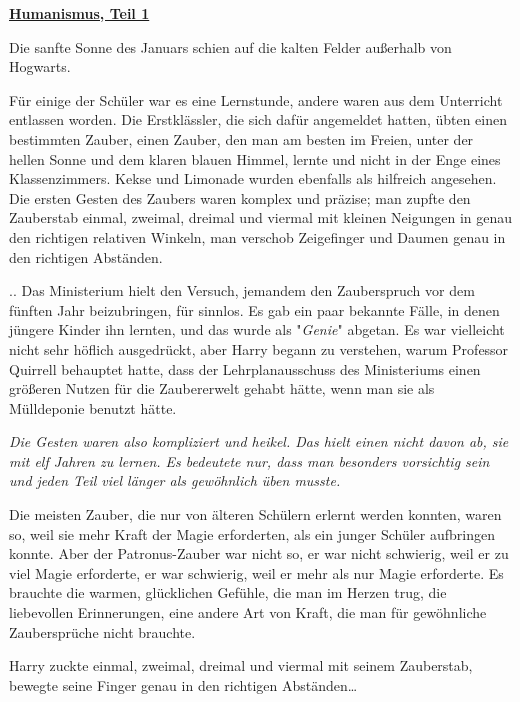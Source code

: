 

\hypertarget{humanismus-teil-1}{%

\textbf{\uline{Humanismus, Teil 1}}

Die sanfte Sonne des Januars schien auf die kalten Felder außerhalb von Hogwarts.

Für einige der Schüler war es eine Lernstunde, andere waren aus dem Unterricht entlassen worden. Die Erstklässler, die sich dafür angemeldet hatten, übten einen bestimmten Zauber, einen Zauber, den man am besten im Freien, unter der hellen Sonne und dem klaren blauen Himmel, lernte und nicht in der Enge eines Klassenzimmers. Kekse und Limonade wurden ebenfalls als hilfreich angesehen. Die ersten Gesten des Zaubers waren komplex und präzise; man zupfte den Zauberstab einmal, zweimal, dreimal und viermal mit kleinen Neigungen in genau den richtigen relativen Winkeln, man verschob Zeigefinger und Daumen genau in den richtigen Abständen.

.. Das Ministerium hielt den Versuch, jemandem den Zauberspruch vor dem fünften Jahr beizubringen, für sinnlos. Es gab ein paar bekannte Fälle, in denen jüngere Kinder ihn lernten, und das wurde als "\emph{Genie}" abgetan. Es war vielleicht nicht sehr höflich ausgedrückt, aber Harry begann zu verstehen, warum Professor Quirrell behauptet hatte, dass der Lehrplanausschuss des Ministeriums einen größeren Nutzen für die Zaubererwelt gehabt hätte, wenn man sie als Mülldeponie benutzt hätte.

\emph{Die Gesten waren also kompliziert und heikel. Das hielt einen nicht davon ab, sie mit elf Jahren zu lernen. Es bedeutete nur, dass man besonders vorsichtig sein und jeden Teil viel länger als gewöhnlich üben musste.}

Die meisten Zauber, die nur von älteren Schülern erlernt werden konnten, waren so, weil sie mehr Kraft der Magie erforderten, als ein junger Schüler aufbringen konnte. Aber der Patronus-Zauber war nicht so, er war nicht schwierig, weil er zu viel Magie erforderte, er war schwierig, weil er mehr als nur Magie erforderte. Es brauchte die warmen, glücklichen Gefühle, die man im Herzen trug, die liebevollen Erinnerungen, eine andere Art von Kraft, die man für gewöhnliche Zaubersprüche nicht brauchte.

Harry zuckte einmal, zweimal, dreimal und viermal mit seinem Zauberstab, bewegte seine Finger genau in den richtigen Abständen…

}
